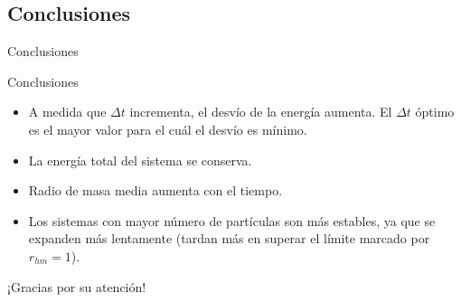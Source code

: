 \documentclass{beamer}
\begin{document}
  \subsection{Conclusiones}
  \begin{frame}
    \centering
    \colorbox{green!20!gray!30}{%
      \begin{minipage}{0.85\textwidth}
        \centering
        \vspace{0.5cm}
        {\Large Conclusiones}
        \vspace{0.5cm}
      \end{minipage}
    }
  \end{frame}
  \begin{frame}{Conclusiones}
    \begin{itemize}
      \item A medida que $\Delta t$ incrementa, el desvío de la energía aumenta. El $\Delta t$ óptimo es el mayor valor para el cuál el desvío es mínimo.
      \item La energía total del sistema se conserva.
      \item Radio de masa media aumenta con el tiempo.
      \item Los sistemas con mayor número de partículas son más estables, ya que se expanden más lentamente (tardan más en superar el límite marcado por $r_{hm}=1$).
    \end{itemize}
  \end{frame}

  \begin{frame}
    \centering
    \Huge ¡Gracias por su atención!
  \end{frame}
\end{document}
